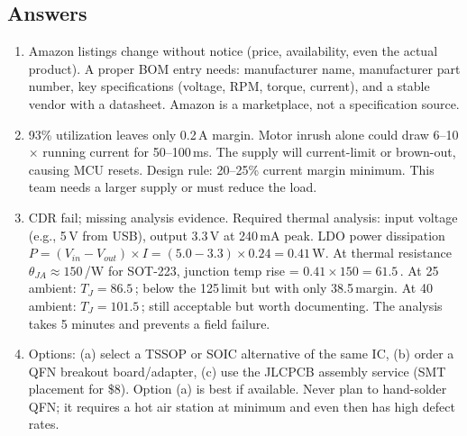 \subsection{Answers}
\begin{enumerate}[leftmargin=1.5em]
\item Amazon listings change without notice (price, availability, even the actual product). A proper BOM entry needs: manufacturer name, manufacturer part number, key specifications (voltage, RPM, torque, current), and a stable vendor with a datasheet. Amazon is a marketplace, not a specification source.
\item 93\% utilization leaves only 0.2\,A margin. Motor inrush alone could draw 6--10$\times$ running current for 50--100\,ms. The supply will current-limit or brown-out, causing MCU resets. Design rule: 20--25\% current margin minimum. This team needs a larger supply or must reduce the load.

\item CDR fail; missing analysis evidence. Required thermal analysis: input voltage (e.g., 5\,V from USB), output 3.3\,V at 240\,mA peak. LDO power dissipation $P = (V_{in} - V_{out}) \times I = (5.0 - 3.3) \times 0.24 = 0.41$\,W. At thermal resistance $\theta_{JA} \approx 150$\,\degC/W for SOT-223, junction temp rise = $0.41 \times 150 = 61.5$\,\degC. At 25\,\degC ambient: $T_J = 86.5$\,\degC; below the 125\,\degC limit but with only 38.5\,\degC margin. At 40\,\degC ambient: $T_J = 101.5$\,\degC; still acceptable but worth documenting. The analysis takes 5 minutes and prevents a field failure.
\item Options: (a) select a TSSOP or SOIC alternative of the same IC, (b) order a QFN breakout board/adapter, (c) use the JLCPCB assembly service (SMT placement for \$8). Option (a) is best if available. Never plan to hand-solder QFN; it requires a hot air station at minimum and even then has high defect rates.
\end{enumerate}


